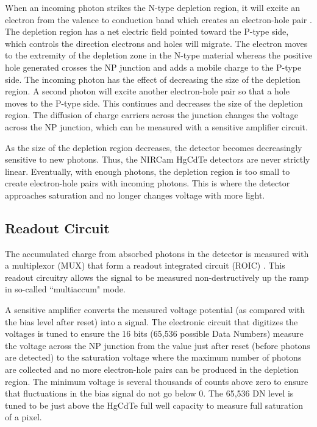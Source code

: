 \documentclass{aastex62}
\begin{document}
When an incoming photon strikes the N-type depletion region, it will excite an electron from the valence to conduction band which creates an electron-hole pair \citep{rieke2007irDetectorReview}.
The depletion region has a net electric field pointed toward the P-type side, which controls the direction electrons and holes will migrate.
The electron moves to the extremity of the depletion zone in the N-type material whereas the positive hole generated crosses the NP junction and adds a mobile charge to the P-type side.
The incoming photon has the effect of decreasing the size of the depletion region.
A second photon will excite another electron-hole pair so that a hole moves to the P-type side.
This continues and decreases the size of the depletion region.
The diffusion of charge carriers across the junction changes the voltage across the NP junction, which can be measured with a sensitive amplifier circuit.

As the size of the depletion region decreases, the detector becomes decreasingly sensitive to new photons.
Thus, the NIRCam HgCdTe detectors are never strictly linear.
Eventually, with enough photons, the depletion region is too small to create electron-hole pairs with incoming photons.
This is where the detector approaches saturation and no longer changes voltage with more light.

\subsection{Readout Circuit}\label{sec:readout}

The accumulated charge from absorbed photons in the detector is measured with a multiplexor (MUX) that form a readout integrated circuit (ROIC) \citep{rieke2007irDetectorReview}.
This readout circuitry allows the signal to be measured non-destructively up the ramp in so-called ``multiaccum" mode.

A sensitive amplifier converts the measured voltage potential (as compared with the bias level after reset) into a signal.
The electronic circuit that digitizes the voltages is tuned to ensure the 16 bits (65,536 possible Data Numbers) measure the voltage across the NP junction from the value just after reset (before photons are detected) to the saturation voltage where the maximum number of photons are collected and no more electron-hole pairs can be produced in the depletion region.
The minimum voltage is several thousands of counts above zero to ensure that fluctuations in the bias signal do not go below 0.
The 65,536 DN level is tuned to be just above the HgCdTe full well capacity to measure full saturation of a pixel.
\end{document}
